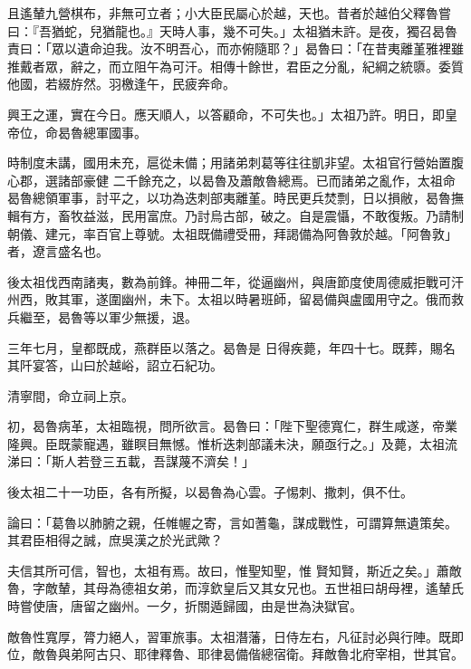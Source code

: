 \begin{pinyinscope}
 且遙輦九營棋布，非無可立者；小大臣民屬心於越，天也。昔者於越伯父釋魯嘗曰：『吾猶蛇，兒猶龍也。』天時人事，幾不可失。」太祖猶未許。是夜，獨召曷魯責曰：「眾以遺命迫我。汝不明吾心，而亦俯隨耶？」曷魯曰：「在昔夷離堇雅裡雖推戴者眾，辭之，而立阻午為可汗。相傳十餘世，君臣之分亂，紀綱之統隳。委質他國，若綴斿然。羽檄逢午，民疲奔命。



 興王之運，實在今日。應天順人，以答顧命，不可失也。」太祖乃許。明日，即皇帝位，命曷魯總軍國事。



 時制度未講，國用未充，扈從未備；用諸弟刺葛等往往凱非望。太祖官行營始置腹心郡，選諸部豪健
 二千餘充之，以曷魯及蕭敵魯總焉。已而諸弟之亂作，太祖命曷魯總領軍事，討平之，以功為迭刺部夷離堇。時民更兵焚剽，日以損敝，曷魯撫輯有方，畜牧益滋，民用富庶。乃討烏古部，破之。自是震懾，不敢復叛。乃請制朝儀、建元，率百官上尊號。太祖既備禮受冊，拜謁備為阿魯敦於越。「阿魯敦」者，遼言盛名也。



 後太祖伐西南諸夷，數為前鋒。神冊二年，從逼幽州，與唐節度使周德威拒戰可汗州西，敗其軍，遂圍幽州，未下。太祖以時暑班師，留曷備與盧國用守之。俄而救兵繼至，曷魯等以軍少無援，退。



 三年七月，皇都既成，燕群臣以落之。曷魯是
 日得疾薨，年四十七。既葬，賜名其阡宴答，山曰於越峪，詔立石紀功。



 清寧間，命立祠上京。



 初，曷魯病革，太祖臨視，問所欲言。曷魯曰：「陛下聖德寬仁，群生咸遂，帝業隆興。臣既蒙寵遇，雖瞑目無憾。惟析迭刺部議未決，願亟行之。」及薨，太祖流涕曰：「斯人若登三五載，吾謀蔑不濟矣！」



 後太祖二十一功臣，各有所擬，以曷魯為心雲。子惕刺、撒刺，俱不仕。



 論曰：「葛魯以肺腑之親，任帷幄之寄，言如蓍龜，謀成戰性，可謂算無遺策矣。其君臣相得之誠，庶吳漢之於光武歟？



 夫信其所可信，智也，太祖有焉。故曰，惟聖知聖，惟
 賢知賢，斯近之矣。」蕭敵魯，字敵輦，其母為德祖女弟，而淳欽皇后又其女兄也。五世祖曰胡母裡，遙輦氏時嘗使唐，唐留之幽州。一夕，折關遁歸國，由是世為決獄官。



 敵魯性寬厚，膂力絕人，習軍旅事。太祖潛藩，日侍左右，凡征討必與行陣。既即位，敵魯與弟阿古只、耶律釋魯、耶律曷備偕總宿衛。拜敵魯北府宰相，世其官。




\end{pinyinscope}
